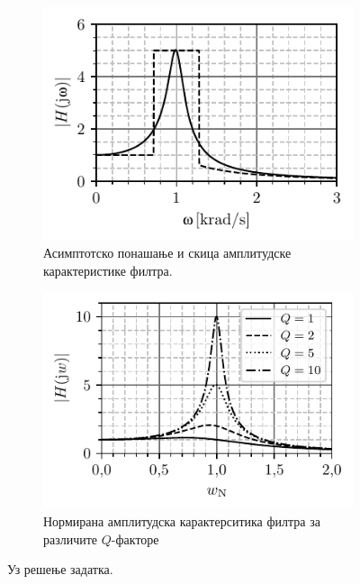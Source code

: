 \begin{figure}
    \centering
    \begin{subfigure}[t]{0.45\textwidth}
        \includegraphics{fig/Q_ampl_approx.pdf}    
        \caption{Асимптотско понашање и скица амплитудске карактеристике филтра.}
        \label{fig:\ID.crtez}
    \end{subfigure}
    \begin{subfigure}[t]{0.45\textwidth}
        \includegraphics{fig/Q_razlicite_ampl_resp.pdf}    
        \caption{Нормирана амплитудска карактерситика филтра за различите $Q$-факторе}
        \label{fig:\ID.freq_resp}
    \end{subfigure}
    \caption{Уз решење задатка.}
\end{figure}
